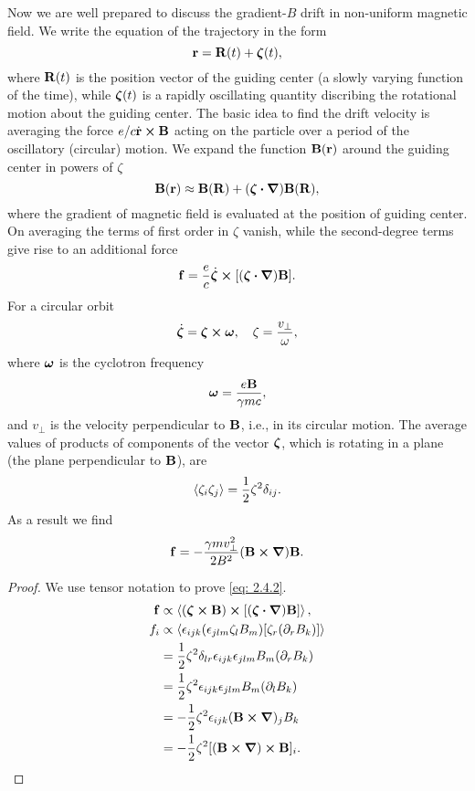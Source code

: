 \documentclass[10pt]{article}
\begin{document}
Now we are well prepared to discuss the gradient-$B$ drift in non-uniform magnetic field. We write the equation of the trajectory in the form
\begin{equation}
	\vb{r} = \vb{R}(t) + \vb*{\zeta}(t),
\end{equation}
where $\vb{R}(t)$ is the position vector of the guiding center (a slowly varying function of the time), while $\vb*{\zeta}(t)$ is a rapidly oscillating quantity discribing the rotational motion about the guiding center. The basic idea to find the drift velocity is averaging the force $e/c \dot{\vb{r}} \cross \vb{B}$ acting on the particle over a period of the oscillatory (circular) motion. We expand the function $\vb{B}(\vb{r})$ around the guiding center in powers of $\zeta$
\begin{equation}
	\vb{B}(\vb{r}) \approx \vb{B}(\vb{R}) + (\vb*{\zeta}\vdot \grad) \vb{B}(\vb{R}),
\end{equation}
where the gradient of magnetic field is evaluated at the position of guiding center. On averaging the terms of first order in $\zeta$ vanish, while the second-degree terms give rise to an additional force
\begin{equation}
	\vb{f} = \frac{e}{c} \dot{\vb*{\zeta}} \cross [(\vb*{\zeta}\vdot \grad) \vb{B}].
\end{equation}
For a circular orbit
\begin{equation}
	\dot{\vb*{\zeta}} = \vb*{\zeta} \cross \vb*{\omega}\qc \zeta = \frac{v_{\perp}}{\omega},
\end{equation}
where $\vb*{\omega}$ is the cyclotron frequency
\begin{equation}
	\vb*{\omega} = \frac{e \vb{B}}{\gamma m c},
\end{equation}
and $v_{\perp}$ is the velocity perpendicular to $\vb{B}$, i.e., in its circular motion. The average values of products of components of the vector $\vb*{\zeta}$, which is rotating in a plane (the plane perpendicular to $\vb{B}$), are
\begin{equation}
	\ev{\zeta_i \zeta_j} = \frac{1}{2}\zeta^2 \delta_{ij}.
\end{equation}
As a result we find
\begin{equation}
	\vb{f} = -\frac{\gamma m v_{\perp}^2}{2B^2} (\vb{B} \cross \grad) \vb{B}. \label{eq: 2.4.2}
\end{equation}
\begin{proof}
	We use tensor notation to prove \eqref{eq: 2.4.2}.
	\begin{align*}
		\vb{f} &\propto \ev{(\vb*{\zeta} \cross \vb{B}) \cross [(\vb*{\zeta} \vdot \grad) \vb{B}]}, \\
		f_i &\propto \ev{\epsilon_{ijk} (\epsilon_{jlm}\zeta_l B_m) [\zeta_r (\partial_r B_k)]} \\
		&= \frac{1}{2} \zeta^2 \delta_{lr} \epsilon_{ijk} \epsilon_{jlm} B_m (\partial_r B_k) \\
		&= \frac{1}{2} \zeta^2 \epsilon_{ijk} \epsilon_{jlm} B_m (\partial_l B_k) \\
		&= -\frac{1}{2} \zeta^2  \epsilon_{ijk} (\vb{B} \cross \grad)_j B_k \\
		&= -\frac{1}{2} \zeta^2 [(\vb{B} \cross \grad) \cross \vb{B}]_i.
	\end{align*}
\end{proof}
\end{document}
